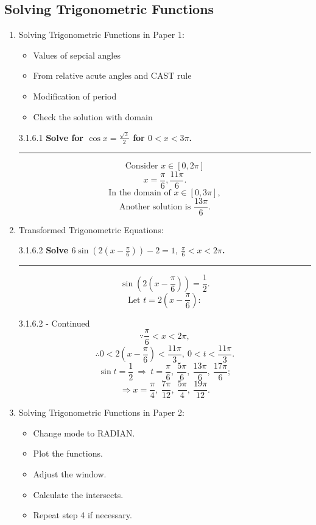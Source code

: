 \documentclass[12pt, a4paper]{article}
\begin{document}
\subsection{Solving Trigonometric Functions}
\begin{enumerate}
  \item Solving Trigonometric Functions in Paper 1: 
  \begin{itemize}
    \item Values of sepcial angles
    \item From relative acute angles and CAST rule
    \item Modification of period
    \item Check the solution with domain
  \end{itemize}
  \begin{example}{3.1.6.1}{}
    \textbf{Solve for $\cos{x}=\frac{\sqrt{3}}{2}$ for $0<x<3\pi$.}\\
    \noindent\rule[0.25\baselineskip]{\textwidth}{1pt}
    $$\text{Consider }x\in[0,2\pi]$$
    $$x=\frac{\pi}{6}, \frac{11\pi}{6}.$$
    $$\text{In the domain of }x\in[0,3\pi],$$
    $$\text{Another solution is }\frac{13\pi}{6}.$$
  \end{example}
  \item Transformed Trigonometric Equations: 
  \begin{example}{3.1.6.2}{}
    \textbf{Solve $6\sin\left(2\left(x-\frac{\pi}{6}\right)\right)-2=1,\ \frac{\pi}{6}<x<2\pi$.}\\
    \noindent\rule[0.25\baselineskip]{\textwidth}{1pt}
    $$\sin\left(2\left(x-\frac{\pi}{6}\right)\right)=\frac{1}{2}.$$
    $$\text{Let }t=2\left(x-\frac{\pi}{6}\right):$$
  \end{example}
  \begin{example}{3.1.6.2 - Continued}{}
    $$\because \frac{\pi}{6}<x<2\pi, $$
    $$\therefore 0<2\left(x-\frac{\pi}{6}\right)<\frac{11\pi}{3},\ 0<t<\frac{11\pi}{3}.$$
    $$\sin t=\frac{1}{2}\ \Rightarrow\ t=\frac{\pi}{6},\ \frac{5\pi}{6},\ \frac{13\pi}{6},\ \frac{17\pi}{6};$$
    $$\Rightarrow x=\frac{\pi}{4},\ \frac{7\pi}{12},\ \frac{5\pi}{4},\ \frac{19\pi}{12}.$$
  \end{example}
  \item Solving Trigonometric Functions in Paper 2: 
  \begin{itemize}
    \item Change mode to RADIAN.
    \item Plot the functions. 
    \item Adjust the window. 
    \item Calculate the intersects.
    \item Repeat step 4 if necessary. 
  \end{itemize}
\end{enumerate}
\end{document}
